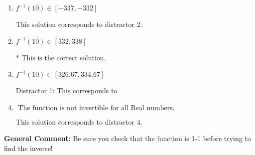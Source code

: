 \documentclass{extbook}[14pt]
\begin{document}
\begin{enumerate}
{\begin{enumerate}[label=\Alph*.]
 This solution corresponds to distractor 3.
\item \( f^{-1}(10) \in [-337, -332] \)

 This solution corresponds to distractor 2.
\item \( f^{-1}(10) \in [332, 338] \)

* This is the correct solution.
\item \( f^{-1}(10) \in [326.67, 334.67] \)

 Distractor 1: This corresponds to 
\item \( \text{ The function is not invertible for all Real numbers. } \)

 This solution corresponds to distractor 4.
\end{enumerate}

\textbf{General Comment:} Be sure you check that the function is 1-1 before trying to find the inverse!
}
\end{enumerate}
\end{document}
